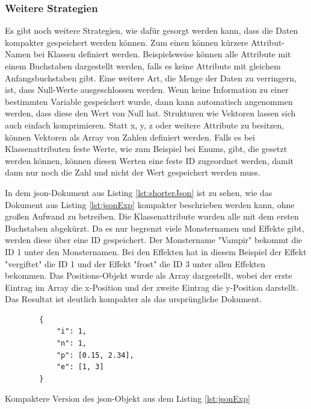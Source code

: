 \subsubsection{Weitere Strategien}
Es gibt noch weitere Strategien, wie dafür gesorgt werden kann, dass die Daten kompakter gespeichert werden können. Zum einen können kürzere Attribut-Namen bei Klassen definiert werden. Beispielsweise können alle Attribute mit einem Buchstaben dargestellt werden, falls es keine Attribute mit gleichem Anfangsbuchstaben gibt. Eine weitere Art, die Menge der Daten zu verringern, ist, dass Null-Werte ausgeschlossen werden. Wenn keine Information zu einer bestimmten Variable gespeichert wurde, dann kann automatisch angenommen werden, dass diese den Wert von Null hat. Strukturen wie Vektoren lassen sich auch einfach komprimieren. Statt x, y, z oder weitere Attribute zu besitzen, können Vektoren als Array von Zahlen definiert werden. Falls es bei Klassenattributen feste Werte, wie zum Beispiel bei Enums, gibt, die gesetzt werden können, können diesen Werten eine feste ID zugeordnet werden, damit dann nur noch die Zahl und nicht der Wert gespeichert werden muss.\cite{objelean2011json}\cite{baeldungReducingJSON}

In dem \ac{json}-Dokument aus Listing \ref{lst:shorterJson} ist zu sehen, wie das Dokument aus Listing \ref{lst:jsonExp} kompakter beschrieben werden kann, ohne großen Aufwand zu betreiben. Die Klassenattribute wurden alle mit dem ersten Buchstaben abgekürzt. Da es nur begrenzt viele Monsternamen und Effekte gibt, werden diese über eine ID gespeichert. Der Monstername "Vampir" bekommt die ID 1 unter den Monsternamen. Bei den Effekten hat in diesem Beispiel der Effekt "vergiftet" die ID 1 und der Effekt "frost" die ID 3 unter allen Effekten bekommen. Das Positions-Objekt wurde als Array dargestellt, wobei der erste Eintrag im Array die x-Position und der zweite Eintrag die y-Position darstellt. Das Resultat ist deutlich kompakter als das ursprüngliche Dokument.

\begin{listing}[htp]
    \begin{verbatim}
        {
            "i": 1,
            "n": 1,
            "p": [0.15, 2.34],
            "e": [1, 3]
        }
    \end{verbatim}
    \caption{Kompaktere Version des \ac{json}-Objekt aus dem Listing \ref{lst:jsonExp}}
    \label{lst:shorterJson}
\end{listing}





